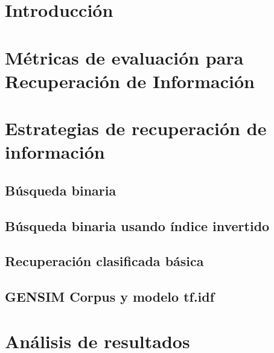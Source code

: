 \documentclass[12pt]{article}
\begin{document}
\thispagestyle{empty}
\tableofcontents
\pagebreak

\setcounter{page}{1}
\section*{Introducción}

\section{Métricas de evaluación para Recuperación de Información}

\section{Estrategias de recuperación de información}

\subsection{Búsqueda binaria}

\subsection{Búsqueda binaria usando índice invertido}

\subsection{Recuperación clasificada básica}

\subsection{GENSIM Corpus y modelo tf.idf}

\section{Análisis de resultados}


\newpage


\end{document}
